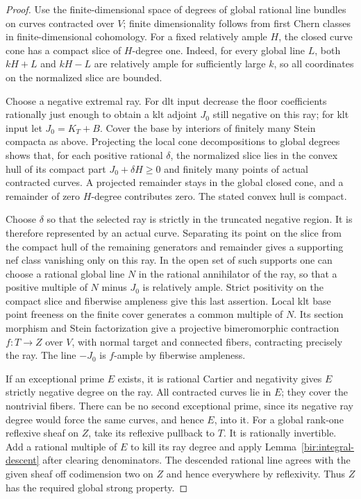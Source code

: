 \documentclass[11pt,letterpaper]{article}
\theoremstyle{definition}
\theoremstyle{remark}
\begin{document}
\begin{proof}
Use the finite-dimensional space of degrees of global rational line
bundles on curves contracted over $V$; finite dimensionality follows
from first Chern classes in finite-dimensional cohomology.  For a
fixed relatively ample $H$, the closed curve cone has a compact slice
of $H$-degree one.  Indeed, for every global line $L$, both
$kH+L$ and $kH-L$ are relatively ample for sufficiently large $k$, so
all coordinates on the normalized slice are bounded.

Choose a negative extremal ray.  For dlt input decrease the floor
coefficients rationally just enough to obtain a klt adjoint $J_0$
still negative on this ray; for klt input let $J_0=K_T+B$.  Cover the
base by interiors of finitely many Stein compacta as above.  Projecting
the local cone decompositions to global degrees shows that, for each
positive rational $\delta$, the normalized slice lies in the convex
hull of its compact part $J_0+\delta H\geq0$ and finitely many points
of actual contracted curves.  A projected remainder stays in the
global closed cone, and a remainder of zero $H$-degree contributes
zero.  The stated convex hull is compact.

Choose $\delta$ so that the selected ray is strictly in the truncated
negative region.  It is therefore represented by an actual curve.
Separating its point on the slice from the compact hull of the
remaining generators and remainder gives a supporting nef class
vanishing only on this ray.  In the open set of such supports one can
choose a rational global line $N$ in the rational annihilator of the
ray, so that a positive multiple of $N$ minus $J_0$ is relatively
ample.  Strict positivity on the compact slice and fiberwise
ampleness give this last assertion.  Local klt base point freeness on
the finite cover generates a common multiple of $N$.  Its section
morphism and Stein factorization give a projective bimeromorphic
contraction $f:T\to Z$ over $V$, with normal target and connected
fibers, contracting precisely the ray.  The line $-J_0$ is
$f$-ample by fiberwise ampleness.

If an exceptional prime $E$ exists, it is rational Cartier and
negativity gives $E$ strictly negative degree on the ray.  All
contracted curves lie in $E$; they cover the nontrivial fibers.  There
can be no second exceptional prime, since its negative ray degree
would force the same curves, and hence $E$, into it.  For a global
rank-one reflexive sheaf on $Z$, take its reflexive pullback to $T$.
It is rationally invertible.  Add a rational multiple of $E$ to kill
its ray degree and apply Lemma~\ref{bir:integral-descent} after
clearing denominators.  The descended rational line agrees with the
given sheaf off codimension two on $Z$ and hence everywhere by
reflexivity.  Thus $Z$ has the required global strong property.


\end{proof}
\end{document}
